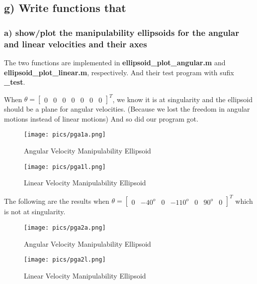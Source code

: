 \documentclass[english,10pt,a4paper]{book}
\begin{document}
    \subsection*{g) Write functions that }
    \subsubsection*{a) show/plot the manipulability ellipsoids for the angular and linear velocities and their axes}
    The two functions are implemented in \textbf{ellipsoid\_plot\_angular.m} and \textbf{ellipsoid\_plot\_linear.m}, respectively. And their test program with sufix \textbf{\_test}.
    
    When $\theta = \begin{bmatrix}
        0 & 0 & 0 & 0 & 0 & 0 & 0
    \end{bmatrix}^T$, we know it is at singularity and the ellipsoid should be a plane for angular velocities. (Because we lost the freedom in angular motions instead of linear motions) And so did our program got.
    \begin{figure}[H]
        \centering
        \begin{minipage}{0.45\textwidth}
            \centering
            \texttt{[image: pics/pga1a.png]} %
            \caption{Angular Velocity Manipulability Ellipsoid}
            \label{fig:pga1a}
        \end{minipage}
        \hfill
        \begin{minipage}{0.45\textwidth}
        \centering
            \texttt{[image: pics/pga1l.png]} %
            \caption{Linear Velocity Manipulability Ellipsoid}
            \label{fig:pga1l}
        \end{minipage}
    \end{figure}

    The following are the results when $\theta = \begin{bmatrix}
        0 & -40^o & 0 & -110^o & 0 & 90^o & 0
    \end{bmatrix}^T$ which is not at singularity.
    \begin{figure}[H]
        \centering
        \begin{minipage}{0.45\textwidth}
            \centering
            \texttt{[image: pics/pga2a.png]} %
            \caption{Angular Velocity Manipulability Ellipsoid}
            \label{fig:pga2a}
        \end{minipage}
        \hfill
        \begin{minipage}{0.45\textwidth}
        \centering
            \texttt{[image: pics/pga2l.png]} %
            \caption{Linear Velocity Manipulability Ellipsoid}
            \label{fig:pga2l}
        \end{minipage}
    \end{figure}
\end{document}
